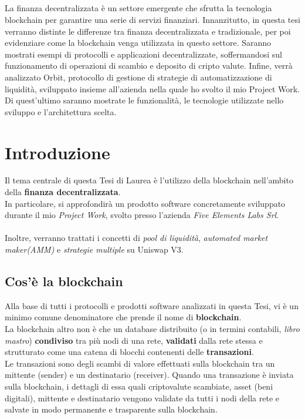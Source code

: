 \documentclass[12pt,a4paper]{report}
\makeatletter
\renewenvironment{abstract}{%
    \if@twocolumn
      \section*{\abstractname}%
    \else
      \begin{center}%
        {\bfseries \Large\abstractname\vspace{\z@}}
      \end{center}%
      \quotation
    \fi}
    {\if@twocolumn\else\endquotation\fi}
\makeatother
\begin{document}
\begin{abstract}
\noindent La finanza decentralizzata è un settore emergente che sfrutta la tecnologia blockchain per garantire una serie di servizi finanziari. Innanzitutto, in questa tesi verranno distinte le differenze tra finanza decentralizzata e tradizionale, per poi evidenziare come la blockchain venga utilizzata in questo settore. Saranno mostrati esempi di protocolli e applicazioni decentralizzate, soffermandosi sul funzionamento di operazioni di scambio e deposito di cripto valute.
Infine, verrà analizzato Orbit, protocollo di gestione di strategie di automatizzazione di liquidità, sviluppato insieme all'azienda nella quale ho svolto il mio Project Work. Di quest'ultimo saranno mostrate le funzionalità, le tecnologie utilizzate nello sviluppo e l'architettura scelta.
\end{abstract}
\tableofcontents



\chapter{Introduzione}

\noindent Il tema centrale di questa Tesi di Laurea è l'utilizzo della blockchain nell'ambito della \textbf{finanza decentralizzata}.\\ In particolare, si approfondirà un prodotto software concretamente sviluppato durante il mio  \textit{Project Work}, svolto presso l'azienda \textit{Five Elements Labs Srl}.
\\\\Inoltre, verranno trattati i concetti di \textit{pool di liquidità}, \textit{automated market maker(AMM)} e \textit{strategie multiple} su Uniswap V3.

\section{Cos'è la blockchain}

Alla base di tutti i protocolli e prodotti software analizzati in questa Tesi, vi è un minimo comune denominatore che prende il nome di \textbf{blockchain}\cite{blockchain}.
\\La blockchain altro non è che un database distribuito (o in termini contabili, \textit{libro mastro}) \textbf{condiviso} tra più nodi di una rete, \textbf{validati} dalla rete stessa e strutturato come una catena di blocchi contenenti delle \textbf{transazioni}.
\\Le transazioni sono degli scambi di valore effettuati sulla blockchain tra un mittente (sender) e un destinatario (receiver).
Quando una transazione è inviata sulla blockchain, i dettagli di essa quali criptovalute scambiate, asset (beni digitali), mittente e destinatario vengono validate da tutti i nodi della rete e salvate in modo permanente e trasparente sulla blockchain.
\end{document}
